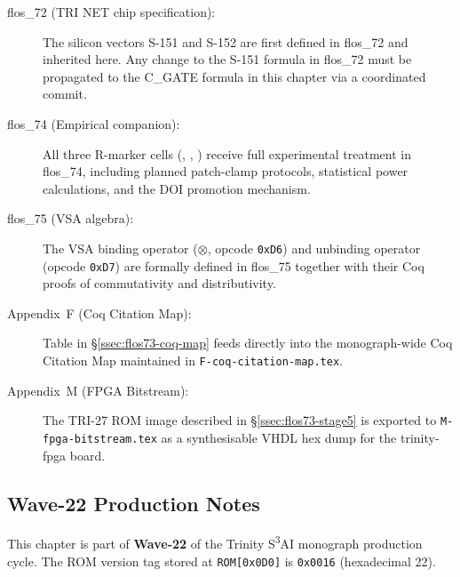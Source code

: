 \begin{description}
  \item[flos\_72 (TRI NET chip specification):]
    The silicon vectors S-151 and S-152 are first defined in flos\_72
    and inherited here.  Any change to the S-151 formula in flos\_72
    must be propagated to the C\_GATE formula in this chapter via a
    coordinated commit.

  \item[flos\_74 (Empirical companion):]
    All three R-marker cells (, , )
    receive full experimental treatment in flos\_74, including planned
    patch-clamp protocols, statistical power calculations, and the DOI
    promotion mechanism.

  \item[flos\_75 (VSA algebra):]
    The VSA binding operator ($\otimes$, opcode \texttt{0xD6}) and
    unbinding operator (opcode \texttt{0xD7}) are formally defined in
    flos\_75 together with their Coq proofs of commutativity and
    distributivity.

  \item[Appendix~F (Coq Citation Map):]
    Table in §\ref{ssec:flos73-coq-map} feeds directly into the
    monograph-wide Coq Citation Map maintained in
    \texttt{F-coq-citation-map.tex}.

  \item[Appendix~M (FPGA Bitstream):]
    The TRI-27 ROM image described in §\ref{ssec:flos73-stage5} is
    exported to \texttt{M-fpga-bitstream.tex} as a synthesisable VHDL
    hex dump for the trinity-fpga board.
\end{description}


\subsection{Wave-22 Production Notes}
\label{ssec:flos73-wave22}

This chapter is part of \textbf{Wave-22} of the Trinity S\textsuperscript{3}AI
monograph production cycle.  The ROM version tag stored at
\texttt{ROM[0x0D0]} is \texttt{0x0016} (hexadecimal 22).

